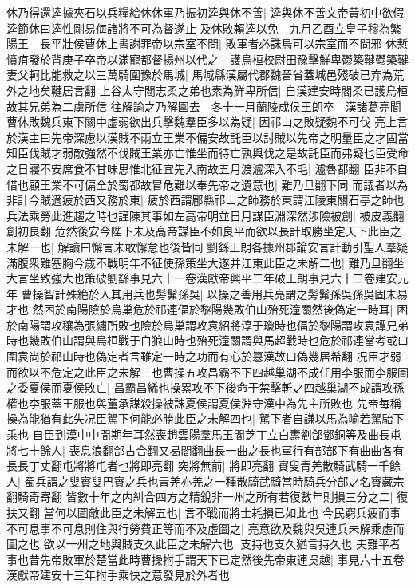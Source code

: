 休乃得還逵據夾石以兵糧給休休軍乃振初逵與休不善|{
	逵與休不善文帝黃初中欲假逵節休曰逵性剛易侮諸將不可為督遂止}
及休敗賴逵以免　九月乙酉立皇子穆為繁陽王　長平壯侯曹休上書謝罪帝以宗室不問|{
	敗軍者必誅烏可以宗室而不問邪}
休慙憤疽發於背庚子卒帝以滿寵都督揚州以代之　護烏桓校尉田豫擊鮮卑鬱築鞬鬱築鞬妻父軻比能救之以三萬騎圍豫於馬城|{
	馬城縣漢屬代郡魏晉省蓋城邑殘破已弃為荒外之地矣鞬居言翻}
上谷太守閻志柔之弟也素為鮮卑所信|{
	自漢建安時閻柔已護烏桓故其兄弟為二虜所信}
往解諭之乃解圍去　冬十一月蘭陵成侯王朗卒　漢諸葛亮聞曹休敗魏兵東下關中虚弱欲出兵擊魏羣臣多以為疑|{
	因祁山之敗疑魏不可伐}
亮上言於漢主曰先帝深慮以漢賊不兩立王業不偏安故託臣以討賊以先帝之明量臣之才固當知臣伐賊才弱敵強然不伐賊王業亦亡惟坐而待亡孰與伐之是故託臣而弗疑也臣受命之日寢不安席食不甘味思惟北征宜先入南故五月渡瀘深入不毛|{
	瀘魯都翻}
臣非不自惜也顧王業不可偏全於蜀都故冒危難以奉先帝之遺意也|{
	難乃旦翻下同}
而議者以為非計今賊適疲於西又務於東|{
	疲於西謂郿縣祁山之師務於東謂江陵東關石亭之師也}
兵法乘勞此進趨之時也謹陳其事如左高帝明並日月謀臣淵深然涉險被創|{
	被皮義翻創初良翻}
危然後安今陛下未及高帝謀臣不如良平而欲以長計取勝坐定天下此臣之未解一也|{
	解讀曰懈言未敢懈怠也後皆同}
劉繇王朗各據州郡論安言計動引聖人羣疑滿腹衆難塞胸今歲不戰明年不征使孫策坐大遂并江東此臣之未解二也|{
	難乃旦翻坐大言坐致強大也策破劉繇事見六十一卷漢獻帝興平二年破王朗事見六十二卷建安元年}
曹操智計殊絶於人其用兵也髣髴孫吳|{
	以操之善用兵亮謂之髣髴孫吳孫吳固未易才也}
然困於南陽險於烏巢危於祁連偪於黎陽幾敗伯山殆死潼關然後偽定一時耳|{
	困於南陽謂攻穰為張繡所敗也險於烏巢謂攻袁紹將淳于瓊時也偪於黎陽謂攻袁譚兄弟時也幾敗伯山謂與烏桓戰于白狼山時也殆死潼關謂與馬超戰時也危於祁連當考或曰圍袁尚於祁山時也偽定者言雖定一時之功而有心於簒漢故曰偽幾居希翻}
况臣才弱而欲以不危定之此臣之未解三也曹操五攻昌霸不下四越巢湖不成任用李服而李服圖之委夏侯而夏侯敗亡|{
	昌霸昌絺也操累攻不下後命于禁擊斬之四越巢湖不成謂攻孫權也李服蓋王服也與董承謀殺操被誅夏侯謂夏侯淵守漢中為先主所敗也}
先帝每稱操為能猶有此失况臣駑下何能必勝此臣之未解四也|{
	駑下者自謙以馬為喻若駑駘下乘也}
自臣到漢中中間期年耳然喪趙雲陽羣馬玉閻芝丁立白夀劉郃鄧銅等及曲長屯將七十餘人|{
	喪息浪翻郃古合翻又曷閤翻曲長一曲之長也軍行有部部下有曲曲各有長長丁丈翻屯將將屯者也將即亮翻}
突將無前|{
	將即亮翻}
賨叟青羌散騎武騎一千餘人|{
	蜀兵謂之叟賨叟巴賨之兵也青羌亦羌之一種散騎武騎當時騎兵分部之名賨藏宗翻騎奇寄翻}
皆數十年之内糾合四方之精銳非一州之所有若復數年則損三分之二|{
	復扶又翻}
當何以圖敵此臣之未解五也|{
	言不戰而將士耗損已如此也}
今民窮兵疲而事不可息事不可息則住與行勞費正等而不及虛圖之|{
	亮意欲及魏與吳連兵未解乘虛而圖之也}
欲以一州之地與賊支久此臣之未解六也|{
	支持也支久猶言持久也}
夫難平者事也昔先帝敗軍於楚當此時曹操拊手謂天下已定然後先帝東連吳越|{
	事見六十五卷漢獻帝建安十三年拊手乘快之意發見於外者也}
